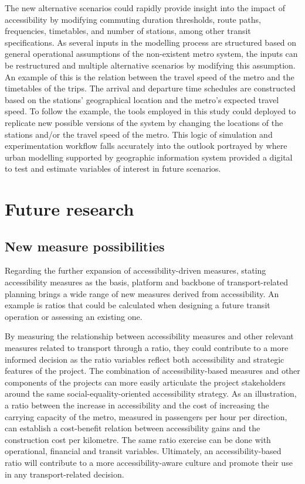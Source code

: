 \documentclass[12pt, a4paper]{report}
\begin{document}
The new alternative scenarios could rapidly provide insight into the impact of accessibility by modifying commuting duration thresholds, route paths, frequencies, timetables, and number of stations, among other transit specifications. As several inputs in the modelling process are structured based on general operational assumptions of the non-existent metro system, the inputs can be restructured and multiple alternative scenarios by modifying this assumption. An example of this is the relation between the travel speed of the metro and the timetables of the trips. The arrival and departure time schedules are constructed based on the stations' geographical location and the metro's expected travel speed. To follow the example, the tools employed in this study could deployed to replicate new possible versions of the system by changing the locations of the stations and/or the travel speed of the metro. This logic of simulation and experimentation workflow falls accurately into the outlook portrayed by \cite{wilsonFutureUrbanModelling2018, battyUrbanModeling2009a,longleyGeographicInformationScience2015} where urban modelling supported by geographic information system provided a digital to test and estimate variables of interest in future scenarios. 


\section{Future research}

\subsection{New measure possibilities}


Regarding the further expansion of accessibility-driven measures, stating accessibility measures as the basis, platform and backbone of transport-related planning brings a wide range of new measures derived from accessibility. An example is ratios that could be calculated when designing a future transit operation or assessing an existing one. 

By measuring the relationship between accessibility measures and other relevant measures related to transport through a ratio, they could contribute to a more informed decision as the ratio variables reflect both accessibility and strategic features of the project. The combination of accessibility-based measures and other components of the projects can more easily articulate the project stakeholders around the same social-equality-oriented accessibility strategy. As an illustration, a ratio between the increase in accessibility and the cost of increasing the carrying capacity of the metro, measured in passengers per hour per direction, can establish a cost-benefit relation between accessibility gains and the construction cost per kilometre. The same ratio exercise can be done with operational, financial and transit variables. Ultimately, an accessibility-based ratio will contribute to a more accessibility-aware culture and promote their use in any transport-related decision.
\end{document}
